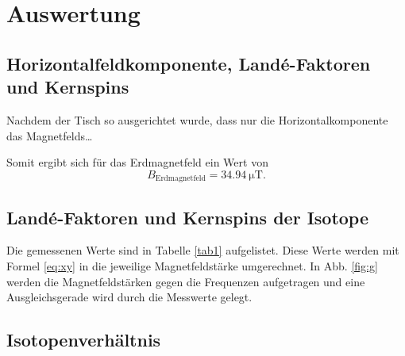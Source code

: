 \section{Auswertung}
\label{sec:Auswertung}

\subsection{Horizontalfeldkomponente, Landé-Faktoren und Kernspins}

Nachdem der Tisch so ausgerichtet wurde, dass nur die Horizontalkomponente das Magnetfelds\dots 

Somit ergibt sich für das Erdmagnetfeld ein Wert von 
\begin{equation*}
    B_\text{Erdmagnetfeld} = \SI{34.94}{\micro\tesla}.
\end{equation*}

\subsection{Landé-Faktoren und Kernspins der Isotope} 

Die gemessenen Werte sind in Tabelle \ref{tab1}
aufgelistet. 
Diese Werte werden mit Formel \eqref{eq:xy} in die jeweilige Magnetfeldstärke umgerechnet. 
In Abb. \ref{fig:g} werden die Magnetfeldstärken gegen die Frequenzen aufgetragen und eine Ausgleichsgerade wird durch die Messwerte gelegt. 




\subsection{Isotopenverhältnis}

